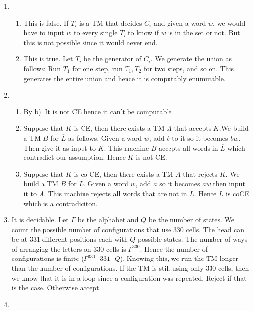\documentclass[12pt, letter paper]{article}
\author{To, Jean-Francois}
\begin{document}
\begin{enumerate}[label=\textbf{Question \arabic*},align=left]
	\item ~\\
		\begin{enumerate}
			\item 
				This is false. If $T_i$ is a TM that decides  $C_i$ and given a word
				$w$, we would have to input  $w$ to every single $T_i$ to know if $w$ is
				in the set or not. But this is not possible since it would never end.
			\item 
				This is true. Let $T_i$ be the generator of  $C_i$. We generate the
				union as follows: Run $ T_1$ for one step, run $ T_1,T_2$ for two steps,
				and so on. This generates the entire union and hence it is computably
				enumurable.
		\end{enumerate}
	\item ~\\
		\begin{enumerate}
			\item By b), It is not CE hence it can't be computable
			\item Suppose that $K$ is CE, then there exists a TM $A$ that accepts
				$K$.We build a TM $B$ for $\overline{L}$ as follows. Given a word $w$,
				add $b$ to it so it becomes $bw$. Then give it as input to $K$. This
				machine $B$ accepts all words in  $\overline{L}$ which contradict our
				assumption. Hence  $K$ is not  CE.
			\item  Suppose that $K$ is co-CE, then there exists a TM $A$ that rejects
				$K$. We build a TM $B$ for  $L$. Given  a word $w$, add $a$ so it
				becomes  $aw$ then input it to  $A$. This machine rejects all words that
				are not in $L$. Hence  $L$ is coCE which is a contradiciton.
		\end{enumerate}
	\item It is decidable. Let $\Gamma$ be the alphabet and  $Q$ be the number of
		states. We count the possible number of configurations that use  $330$
		cells. The head can be at  $331$ different positions  each with $Q$ possible
		states. The number of ways of arranging the letters on  $330$ cells is
		$\Gamma^{330}$. Hence the number of configurations is finite ($\Gamma^{330}
		\cdot 331 \cdot Q$). Knowing this, we
		run the TM longer than the number of configurations. If the TM is still
		using only  $330$ cells, then we know that it is in a loop since a
		configuration was repeated. Reject if that is the case. Otherwise accept.
	\item ~\\

\end{enumerate}
\end{document}
